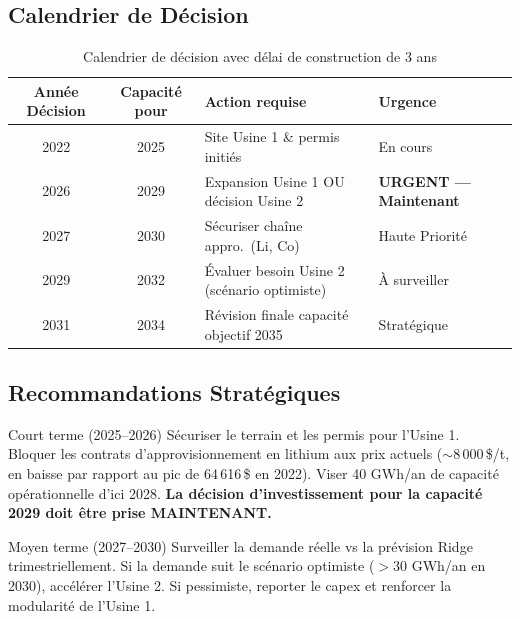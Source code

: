 \documentclass[12pt,a4paper]{article}
\begin{document}
\subsection{Calendrier de Décision}

\begin{table}[H]
\centering
\caption{Calendrier de décision avec délai de construction de 3 ans}
\begin{tabular}{ccp{5cm}l}
\toprule
\textbf{Année Décision} & \textbf{Capacité pour}
  & \textbf{Action requise} & \textbf{Urgence} \\
\midrule
2022 & 2025 & Site Usine 1 \& permis initiés
  & En cours \\
\rowcolor{rowblue}
2026 & 2029 & Expansion Usine 1 OU décision Usine 2
  & \textbf{URGENT --- Maintenant} \\
2027 & 2030 & Sécuriser chaîne appro.\ (Li, Co)
  & Haute Priorité \\
2029 & 2032 & Évaluer besoin Usine 2 (scénario optimiste)
  & À surveiller \\
2031 & 2034 & Révision finale capacité objectif 2035
  & Stratégique \\
\bottomrule
\end{tabular}
\end{table}

\subsection{Recommandations Stratégiques}

\begin{termbox}{Court terme (2025--2026)}
Sécuriser le terrain et les permis pour l'Usine 1. Bloquer les contrats
d'approvisionnement en lithium aux prix actuels ($\sim$8\,000\,\$/t, en baisse par
rapport au pic de 64\,616\,\$ en 2022). Viser 40 GWh/an de capacité opérationnelle
d'ici 2028. \textbf{La décision d'investissement pour la capacité 2029 doit être prise
MAINTENANT.}
\end{termbox}

\vspace{0.6em}

\begin{termbox}{Moyen terme (2027--2030)}
Surveiller la demande réelle vs la prévision Ridge trimestriellement. Si la demande
suit le scénario optimiste ($>30$ GWh/an en 2030), accélérer l'Usine 2. Si pessimiste,
reporter le capex et renforcer la modularité de l'Usine 1.
\end{termbox}
\end{document}
